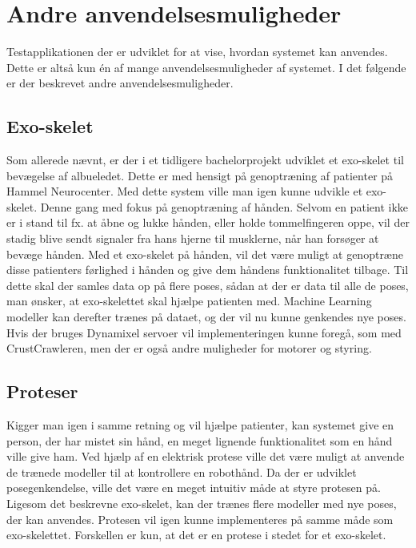\section{Andre anvendelsesmuligheder}
Testapplikationen der er udviklet for at vise, hvordan systemet kan anvendes. Dette er altså kun én af mange anvendelsesmuligheder af systemet. I det følgende er der beskrevet andre anvendelsesmuligheder.

\subsection{Exo-skelet}
Som allerede nævnt, er der i et tidligere bachelorprojekt\citep{RefWorks:7} udviklet et exo-skelet til bevægelse af albueledet. Dette er med hensigt på genoptræning af patienter på Hammel Neurocenter. Med dette system ville man igen kunne udvikle et exo-skelet. Denne gang med fokus på genoptræning af hånden. Selvom en patient ikke er i stand til fx. at  åbne og lukke hånden, eller holde tommelfingeren oppe, vil der stadig blive sendt signaler fra hans hjerne til musklerne, når han forsøger at bevæge hånden. Med et exo-skelet på hånden, vil det være muligt at genoptræne disse patienters førlighed i hånden og give dem håndens funktionalitet tilbage. Til dette skal der samles data op på flere poses, sådan at der er data til alle de poses, man ønsker, at exo-skelettet skal hjælpe patienten med. Machine Learning modeller kan derefter trænes på dataet, og der vil nu kunne genkendes nye poses. Hvis der bruges Dynamixel servoer vil implementeringen kunne foregå, som med CrustCrawleren, men der er også andre muligheder for motorer og styring.

\subsection{Proteser}
Kigger man igen i samme retning og vil hjælpe patienter, kan systemet give en person, der har mistet sin hånd, en meget lignende funktionalitet som en hånd ville give ham. Ved hjælp af en elektrisk protese ville det være muligt at anvende de trænede modeller til at kontrollere en robothånd. Da der er udviklet posegenkendelse, ville det være en meget intuitiv måde at styre protesen på. Ligesom det beskrevne exo-skelet, kan der trænes flere modeller med nye poses, der kan anvendes. Protesen vil igen kunne implementeres på samme måde som exo-skelettet. Forskellen er kun, at det er en protese i stedet for et exo-skelet.

